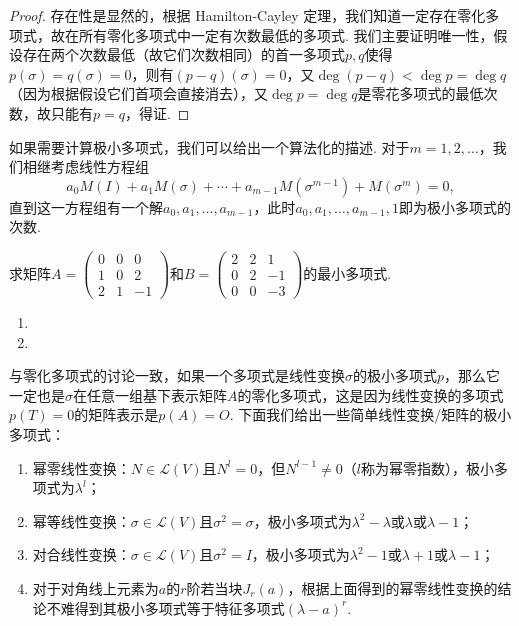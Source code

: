 \begin{proof}
    存在性是显然的，根据 Hamilton-Cayley 定理，我们知道一定存在零化多项式，故在所有零化多项式中一定有次数最低的多项式. 我们主要证明唯一性，假设存在两个次数最低（故它们次数相同）的首一多项式$p,q$使得$p(\sigma)=q(\sigma)=0$，则有$(p-q)(\sigma)=0$，又$\deg(p-q)<\deg p=\deg q$（因为根据假设它们首项会直接消去），又$\deg p=\deg q$是零花多项式的最低次数，故只能有$p=q$，得证.
\end{proof}

如果需要计算极小多项式，我们可以给出一个算法化的描述. 对于$m=1,2,\ldots$，我们相继考虑线性方程组
\[a_0M(I)+a_1M(\sigma)+\cdots+a_{m-1}M(\sigma^{m-1})+M(\sigma^m)=0,\]
直到这一方程组有一个解$a_0,a_1,\ldots,a_{m-1}$，此时$a_0,a_1,\ldots,a_{m-1},1$即为极小多项式的次数.
\begin{example} \label{ex:21:极小多项式}
    求矩阵$A=\begin{pmatrix}
            0 & 0 & 0 \\ 1 & 0 & 2 \\ 2 & 1 & -1
        \end{pmatrix}$和$B=\begin{pmatrix}
            2 & 2 & 1 \\ 0 & 2 & -1 \\ 0 & 0 & -3
        \end{pmatrix}$的最小多项式.
\end{example}

\begin{solution}
    \begin{enumerate}
        \item

        \item
    \end{enumerate}
\end{solution}

与零化多项式的讨论一致，如果一个多项式是线性变换$\sigma$的极小多项式$p$，那么它一定也是$\sigma$在任意一组基下表示矩阵$A$的零化多项式，这是因为线性变换的多项式$p(T)=0$的矩阵表示是$p(A)=O$. 下面我们给出一些简单线性变换/矩阵的极小多项式：
\begin{enumerate}
    \item 幂零线性变换：$N\in \mathcal{L}(V)$且$N^l=0$，但$N^{l-1}\neq 0$（$l$称为幂零指数），极小多项式为$\lambda^l$；

    \item 幂等线性变换：$\sigma\in \mathcal{L}(V)$且$\sigma^2=\sigma$，极小多项式为$\lambda^2-\lambda$或$\lambda$或$\lambda-1$；

    \item 对合线性变换：$\sigma\in \mathcal{L}(V)$且$\sigma^2=I$，极小多项式为$\lambda^2-1$或$\lambda+1$或$\lambda-1$；

    \item 对于对角线上元素为$a$的$r$阶若当块$J_r(a)$，根据上面得到的幂零线性变换的结论不难得到其极小多项式等于特征多项式$(\lambda-a)^r$.
\end{enumerate}

